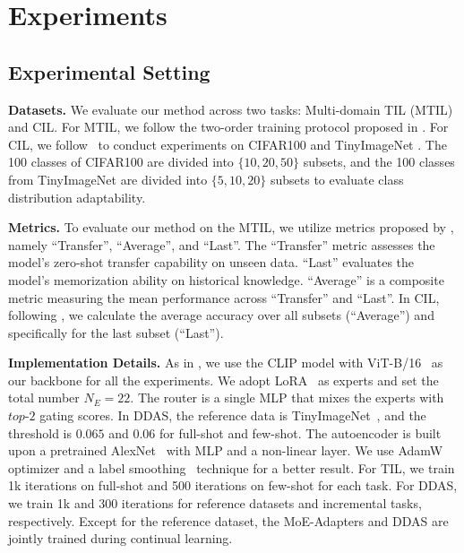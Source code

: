 



\section{Experiments}
\subsection{Experimental Setting}
\label{ablation study}
\textbf{Datasets.}
We evaluate our method across two tasks: Multi-domain TIL (MTIL) and CIL. For MTIL, we follow the two-order training protocol proposed in \cite{zheng2023preventing}. For CIL, we follow~\cite{douillard2022dytox} to conduct experiments on CIFAR100 \cite{douillard2022dytox} and TinyImageNet \cite{yan2021dynamically}. The 100 classes of CIFAR100 are divided into $\{10, 20, 50\}$ subsets, and the 100 classes from TinyImageNet are divided into $\{ 5, 10, 20\}$ subsets to evaluate class distribution adaptability.

%


\noindent\textbf{Metrics.}
To evaluate our method on the MTIL, we utilize metrics proposed by \cite{zheng2023preventing}, namely ``Transfer'', ``Average'', and ``Last''. The ``Transfer'' metric assesses the model's zero-shot transfer capability on unseen data. ``Last'' evaluates the model's memorization ability on historical knowledge. ``Average'' is a composite metric measuring the mean performance across ``Transfer'' and ``Last''. In CIL, following \cite{douillard2022dytox}, we calculate the average accuracy over all subsets (``Average'') and specifically for the last subset (``Last'').

% 



\noindent\textbf{Implementation Details.}
As in \cite{zheng2023preventing}, we use the CLIP model with ViT-B/16~\cite{dosovitskiy2020image} as our backbone for all the experiments. 
We adopt LoRA~\cite{hu2021lora} as experts and set the total number $N_E=22$. The router is a single MLP that mixes the experts with $top$-$2$ gating scores. In DDAS, the reference data is TinyImageNet~\cite{yan2021dynamically}, and the threshold is $0.065$ and $0.06$ for full-shot and few-shot. The autoencoder is built upon a pretrained AlexNet~\cite{krizhevsky2012imagenet} with MLP and a non-linear layer. We use AdamW~\cite{loshchilov2017decoupled} optimizer and a label smoothing~\cite{muller2019does} technique for a better result.
For TIL, we train 1k iterations on full-shot and 500 iterations on few-shot for each task. For DDAS, we train 1k and 300 iterations for reference datasets and incremental tasks, respectively. Except for the reference dataset, the MoE-Adapters and DDAS are jointly trained during continual learning. %





